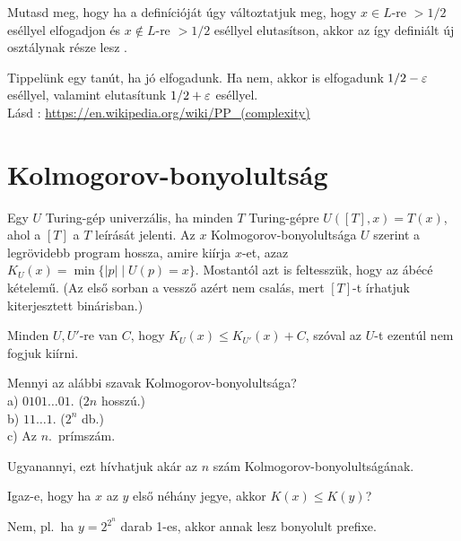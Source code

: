 \begin{Exercise}[counter={sorszam}, difficulty=0]
	Mutasd meg, hogy ha a \BPP defin\'ici\'oj\'at \'ugy v\'altoztatjuk meg, hogy $x\in L$-re $>1/2$ es\'ellyel elfogadjon \'es $x\notin L$-re $>1/2$ es\'ellyel elutas\'itson, akkor az \'igy defini\'alt \'uj oszt\'alynak r\'esze lesz \NP.	
\end{Exercise}	
\begin{Answer}
	Tippel\"unk egy tan\'ut, ha j\'o elfogadunk. Ha nem, akkor is elfogadunk $1/2-\varepsilon$ es\'ellyel, valamint elutas\'itunk $1/2+\varepsilon$ es\'ellyel.\\
	L\'asd : \url{https://en.wikipedia.org/wiki/PP_(complexity)}
\end{Answer}



\chapter{Kolmogorov-bonyolultság}

 Egy $U$ Turing-g\'ep univerz\'alis, ha minden $T$ Turing-g\'epre $U([T],x)=T(x)$, ahol a $[T]$ a $T$ le\'ir\'as\'at jelenti. Az $x$ Kolmogorov-bonyolultsága $U$ szerint a legr\"ovidebb program hossza, amire ki\'irja $x$-et, azaz $K_U(x)=\min \{|p|\mid U(p)=x\}$. Mostant\'ol azt is feltessz\"uk, hogy az \'ab\'ec\'e k\'etelem\H u. (Az els\H o sorban a vessz\H o az\'ert nem csal\'as, mert $[T]$-t \'irhatjuk kiterjesztett bin\'arisban.)
	
\begin{Exercise}[counter={sorszam}, difficulty=0]
	Minden $U,U'$-re van $C$, hogy $K_U(x)\le K_{U'}(x)+C$, sz\'oval az $U$-t ezent\'ul nem fogjuk ki\'irni.
\end{Exercise}	

\begin{Exercise}[counter={sorszam}, difficulty=0]
	Mennyi az alábbi szavak Kolmogorov-bonyolultsága?\\
	a) $0101\ldots 01$. ($2n$ hosszú.)\\
	b) $11\ldots 1$. ($2^n$ db.)\\
	c) Az $n$.\ prímszám.
\end{Exercise}	
\begin{Answer}
	Ugyanannyi, ezt h\'ivhatjuk ak\'ar az $n$ sz\'am Kolmogorov-bonyolultság\'anak.
\end{Answer}

\begin{Exercise}[counter={sorszam}, difficulty=0]
	Igaz-e, hogy ha $x$ az $y$ els\H o n\'eh\'any jegye, akkor $K(x)\le K(y)$?
\end{Exercise}	
\begin{Answer}
	Nem, pl.\ ha $y=2^{2^n}$ darab 1-es, akkor annak lesz bonyolult prefixe.
\end{Answer}

